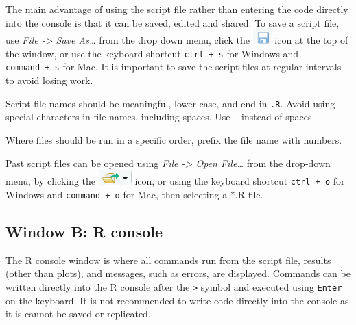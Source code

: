 \documentclass[
  letterpaper,
  DIV=11,
  numbers=noendperiod]{scrreprt}
\begin{document}
The main advantage of using the script file rather than entering the
code directly into the console is that it can be saved, edited and
shared. To save a script file, use \emph{File -\textgreater{} Save
As\ldots{}} from the drop down menu, click the
\includegraphics{img/save_icon.png} icon at the top of the window, or
use the keyboard shortcut \texttt{ctrl\ +\ s} for Windows and
\texttt{command\ +\ s} for Mac. It is important to save the script files
at regular intervals to avoid losing work.

\begin{tcolorbox}[enhanced jigsaw, bottomrule=.15mm, left=2mm, leftrule=.75mm, bottomtitle=1mm, coltitle=black, colbacktitle=quarto-callout-tip-color!10!white, toptitle=1mm, arc=.35mm, breakable, title=\textcolor{quarto-callout-tip-color}{\faLightbulb}\hspace{0.5em}{Style tip}, rightrule=.15mm, toprule=.15mm, opacityback=0, opacitybacktitle=0.6, titlerule=0mm, colback=white, colframe=quarto-callout-tip-color-frame]

Script file names should be meaningful, lower case, and end in
\texttt{.R}. Avoid using special characters in file names, including
spaces. Use \texttt{\_} instead of spaces.

Where files should be run in a specific order, prefix the file name with
numbers.

\end{tcolorbox}

Past script files can be opened using \emph{File -\textgreater{} Open
File\ldots{}} from the drop-down menu, by clicking the
\includegraphics{img/open_icon.png} icon, or using the keyboard shortcut
\texttt{ctrl\ +\ o} for Windows and \texttt{command\ +\ o} for Mac, then
selecting a *.R file.

\subsection{Window B: R console}\label{window-b-r-console}

The R console window is where all commands run from the script file,
results (other than plots), and messages, such as errors, are displayed.
Commands can be written directly into the R console after the
\texttt{\textgreater{}} symbol and executed using \texttt{Enter} on the
keyboard. It is not recommended to write code directly into the console
as it is cannot be saved or replicated.
\end{document}
